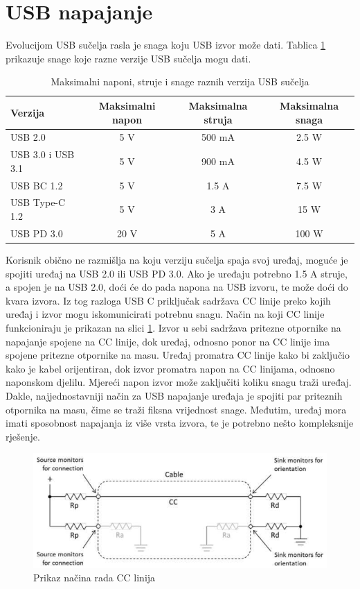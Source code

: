 \section{USB napajanje}

Evolucijom USB sučelja rasla je snaga koju USB izvor može dati. Tablica \ref{tab:USB} prikazuje snage koje razne verzije USB sučelja mogu dati.
\begin{table}[htbp]
    \centering
    \caption{Maksimalni naponi, struje i snage raznih verzija USB sučelja \cite{ti:usb}}
    \begin{tabular}{|l|c|c|c|} \hline
    Verzija & Maksimalni napon & Maksimalna struja & Maksimalna snaga \\
    \hline
    USB 2.0 & 5 V & 500 mA & 2.5 W \\
    \hline
    USB 3.0 i USB 3.1 & 5 V & 900 mA & 4.5 W \\
    \hline
    USB BC 1.2 & 5 V & 1.5 A & 7.5 W \\
    \hline
    USB Type-C 1.2 & 5 V & 3 A & 15 W \\
    \hline
    USB PD 3.0 & 20 V & 5 A & 100 W \\
    \hline
    \end{tabular}
    \label{tab:USB}
\end{table}
Korisnik obično ne razmišlja na koju verziju sučelja spaja svoj uređaj, moguće je spojiti uređaj na USB 2.0 ili USB PD 3.0. Ako je uređaju potrebno 1.5 A struje, a spojen je na USB 2.0, doći će do pada napona na USB izvoru, te može doći do kvara izvora. Iz tog razloga USB C priključak sadržava CC linije preko kojih uređaj i izvor mogu iskomunicirati potrebnu snagu. Način na koji CC linije funkcioniraju je prikazan na slici \ref{slk:USB_CC_LINES}. Izvor u sebi sadržava pritezne otpornike na napajanje spojene na CC linije, dok uređaj, odnosno ponor na CC linije ima spojene pritezne otpornike na masu. Uređaj promatra CC linije kako bi zaključio kako je kabel orijentiran, dok izvor promatra napon na CC linijama, odnosno naponskom djelilu. Mjereći napon izvor može zaključiti koliku snagu traži uređaj. Dakle, najjednostavniji način za USB napajanje uređaja je spojiti par priteznih otpornika na masu, čime se traži fiksna vrijednost snage. Međutim, uređaj mora imati sposobnost napajanja iz više vrsta izvora, te je potrebno nešto kompleksnije rješenje.
\begin{figure}[htb]
    \centering
    \includegraphics[width=10 cm]{Figures/USB_CC_LINES.png}
    \caption{Prikaz načina rada CC linija \cite{ti:usb}}
    \label{slk:USB_CC_LINES}
\end{figure}
